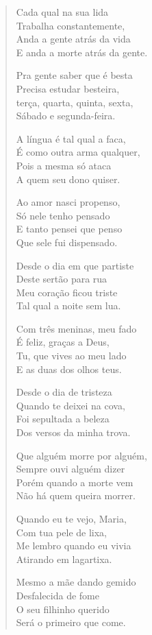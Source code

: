\begin{verse}
Cada qual na sua lida\\
Trabalha constantemente,\\
Anda a gente atrás da vida\\
E anda a morte atrás da gente.

Pra gente saber que é besta\\
Precisa estudar besteira,\\
terça, quarta, quinta, sexta,\\
Sábado e segunda-feira.

A língua é tal qual a faca,\\
É como outra arma qualquer,\\
Pois a mesma só ataca\\
A quem seu dono quiser.

Ao amor nasci propenso,\\
Só nele tenho pensado\\
E tanto pensei que penso\\
Que sele fui dispensado.

Desde o dia em que partiste\\
Deste sertão para rua\\
Meu coração ficou triste\\
Tal qual a noite sem lua.

Com três meninas, meu fado\\
É feliz, graças a Deus,\\
Tu, que vives ao meu lado\\
E as duas dos olhos teus.

Desde o dia de tristeza\\
Quando te deixei na cova,\\
Foi sepultada a beleza\\
Dos versos da minha trova.

Que alguém morre por alguém,\\
Sempre ouvi alguém dizer\\
Porém quando a morte vem\\
Não há quem queira morrer.

Quando eu te vejo, Maria,\\
Com tua pele de lixa,\\
Me lembro quando eu vivia\\
Atirando em lagartixa.

Mesmo a mãe dando gemido\\
Desfalecida de fome\\
O seu filhinho querido\\
Será o primeiro que come.


\end{verse}
